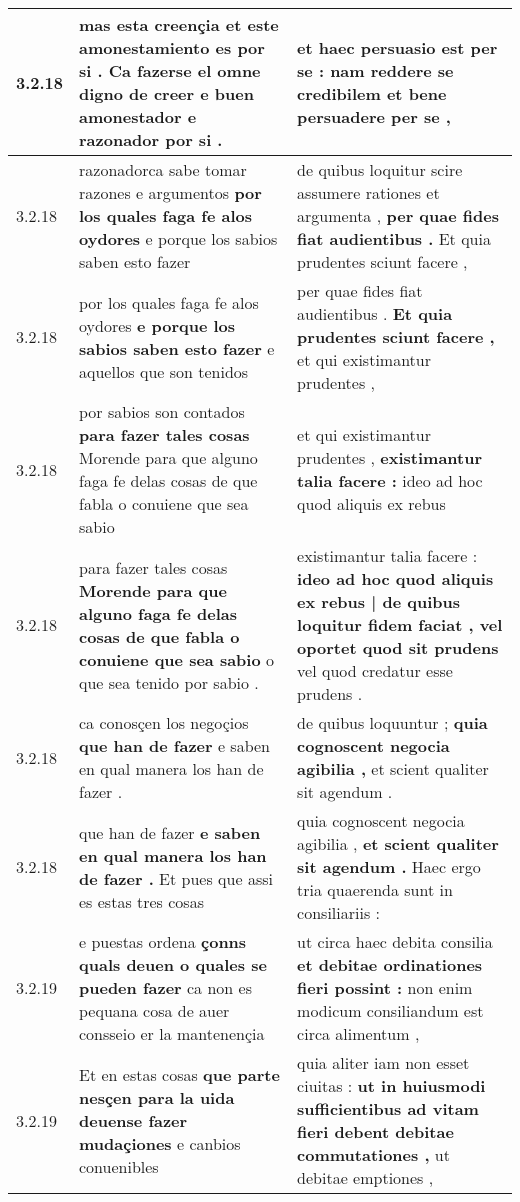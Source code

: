 \begin{tabular}{|p{1cm}|p{6.5cm}|p{6.5cm}|}
3.2.18 & mas esta creençia et este amonestamiento es por si . \textbf{ Ca fazerse el omne digno de creer } e buen amonestador e razonador por si . & et haec persuasio est per se : \textbf{ nam reddere se credibilem } et bene persuadere per se , \\\hline
3.2.18 & razonadorca sabe tomar razones e argumentos \textbf{ por los quales faga fe alos oydores } e porque los sabios saben esto fazer & de quibus loquitur scire assumere rationes et argumenta , \textbf{ per quae fides fiat audientibus . } Et quia prudentes sciunt facere , \\\hline
3.2.18 & por los quales faga fe alos oydores \textbf{ e porque los sabios saben esto fazer } e aquellos que son tenidos & per quae fides fiat audientibus . \textbf{ Et quia prudentes sciunt facere , } et qui existimantur prudentes , \\\hline
3.2.18 & por sabios son contados \textbf{ para fazer tales cosas } Morende para que alguno faga fe delas cosas de que fabla o conuiene que sea sabio & et qui existimantur prudentes , \textbf{ existimantur talia facere : } ideo ad hoc quod aliquis ex rebus \\\hline
3.2.18 & para fazer tales cosas \textbf{ Morende para que alguno faga fe delas cosas de que fabla o conuiene que sea sabio } o que sea tenido por sabio . & existimantur talia facere : \textbf{ ideo ad hoc quod aliquis ex rebus | de quibus loquitur fidem faciat , vel oportet quod sit prudens } vel quod credatur esse prudens . \\\hline
3.2.18 & ca conosçen los negoçios \textbf{ que han de fazer } e saben en qual manera los han de fazer . & de quibus loquuntur ; \textbf{ quia cognoscent negocia agibilia , } et scient qualiter sit agendum . \\\hline
3.2.18 & que han de fazer \textbf{ e saben en qual manera los han de fazer . } Et pues que assi es estas tres cosas & quia cognoscent negocia agibilia , \textbf{ et scient qualiter sit agendum . } Haec ergo tria quaerenda sunt in consiliariis : \\\hline
3.2.19 & e puestas ordena \textbf{ çonns quals deuen o quales se pueden fazer } ca non es pequana cosa de auer consseio er la mantenençia & ut circa haec debita consilia \textbf{ et debitae ordinationes fieri possint : } non enim modicum consiliandum est circa alimentum , \\\hline
3.2.19 & Et en estas cosas \textbf{ que parte nesçen para la uida deuense fazer mudaçiones } e canbios conuenibles & quia aliter iam non esset ciuitas : \textbf{ ut in huiusmodi sufficientibus ad vitam fieri debent debitae commutationes , } ut debitae emptiones , \\\hline

\end{tabular}
